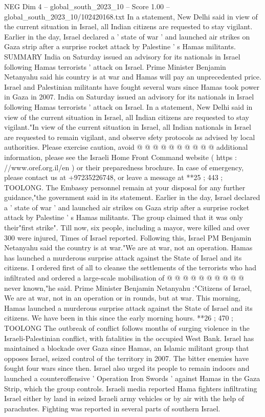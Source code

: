 \begin{textsample}{NEG Dim 4 – global\_south\_2023\_10 – Score 1.00 – global\_south\_2023\_10/102420168.txt}  \label{ex:f4_neg_037}
In a statement, New Delhi said in view of the current situation in Israel, all Indian citizens are requested to stay vigilant.
Earlier in the day, Israel declared a ' state of war ' and launched air strikes on Gaza strip after a surprise rocket attack by Palestine ' s Hamas militants.
SUMMARY India on Saturday issued an advisory for its nationals in Israel following Hamas terrorists ' attack on Israel.
Prime Minister Benjamin Netanyahu said his country is at war and Hamas will pay an unprecedented price.
Israel and Palestinian militants have fought several wars since Hamas took power in Gaza in 2007.
India on Saturday issued an advisory for its nationals in Israel following Hamas terrorists ' attack on Israel.
In a statement, New Delhi said in view of the current situation in Israel, all Indian citizens are requested to stay vigilant."In view of the current situation in Israel, all Indian nationals in Israel are requested to remain vigilant, and observe sfety protocols as advised by local authorities.
Please exercise caution, avoid @ @ @ @ @ @ @ @ @ @ additional information, please see the Israeli Home Front Command website ( https : //www.oref.org.il/en ) or their preparedness brochure.
In case of emergency, please contact us at +97235226748, or leave a message at **25 ; 443 ; TOOLONG.
The Embassy personnel remain at your disposal for any further guidance,"the government said in its statement.
Earlier in the day, Israel declared a ' state of war ' and launched air strikes on Gaza strip after a surprise rocket attack by Palestine ' s Hamas militants.
The group claimed that it was only their"first strike".
Till now, six people, including a mayor, were killed and over 300 were injured, Times of Israel reported.
Following this, Israel PM Benjamin Netanyahu said the country is at war."We are at war, not an operation.
Hamas has launched a murderous surprise attack against the State of Israel and its citizens.
I ordered first of all to cleanse the settlements of the terrorists who had infiltrated and ordered a large-scale mobilisation of @ @ @ @ @ @ @ @ @ @ never known,"he said.
Prime Minister Benjamin Netanyahu :"Citizens of Israel, We are at war, not in an operation or in rounds, but at war.
This morning, Hamas launched a murderous surprise attack against the State of Israel and its citizens.
We have been in this since the early morning hours. **26 ; 470 ; TOOLONG The outbreak of conflict follows months of surging violence in the Israeli-Palestinian conflict, with fatalities in the occupied West Bank.
Israel has maintained a blockade over Gaza since Hamas, an Islamic militant group that opposes Israel, seized control of the territory in 2007.
The bitter enemies have fought four wars since then.
Israel also urged its people to remain indoors and launched a counteroffensive ' Operation Iron Swords ' against Hamas in the Gaza Strip, which the group controls.
Israeli media reported Hama fighters infiltrating Israel either by land in seized Israeli army vehicles or by air with the help of parachutes.
Fighting was reported in several parts of southern Israel.

\end{textsample}
